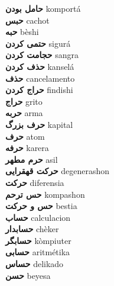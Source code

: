 \textbf{ حامل بودن  } komportá \\
\textbf{ حبس  } cachot \\
\textbf{ حبه  } bèshi \\
\textbf{ حتمی کردن  } sigurá \\
\textbf{ حجامت کردن  } sangra \\
\textbf{ حذف کردن  } kanselá \\
\textbf{ حذف  } cancelamento \\
\textbf{ حراج کردن  } findishi \\
\textbf{ حراج  } grito \\
\textbf{ حربه  } arma \\
\textbf{ حرف بزرگ  } kapital \\
\textbf{ حرف  } atom \\
\textbf{ حرفه  } karera \\
\textbf{ حرم مطهر  } asil \\
\textbf{ حرکت قهقرایی  } degenerashon \\
\textbf{ حرکت  } diferensia \\
\textbf{ حس ترحم  } kompashon \\
\textbf{ حس و حرکت  } bestia \\
\textbf{ حساب  } calculacion \\
\textbf{ حسابدار  } chèker \\
\textbf{ حسابگر  } kòmpiuter \\
\textbf{ حسابی  } aritmétika \\
\textbf{ حساس  } delikado \\
\textbf{ حسن  } beyesa \\

